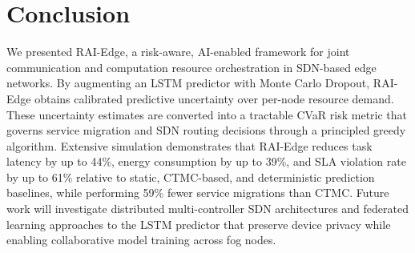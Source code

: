 \documentclass[conference]{IEEEtran}
\begin{document}
\section{Conclusion}
\label{sec:conclusion}

We presented RAI-Edge, a risk-aware, AI-enabled framework for joint
communication and computation resource orchestration in SDN-based edge
networks. By augmenting an LSTM predictor with Monte Carlo Dropout,
RAI-Edge obtains calibrated predictive uncertainty over per-node
resource demand. These uncertainty estimates are converted into a
tractable CVaR risk metric that governs service migration and SDN
routing decisions through a principled greedy algorithm. Extensive
simulation demonstrates that RAI-Edge reduces task latency by up to
44\%, energy consumption by up to 39\%, and SLA violation rate by up
to 61\% relative to static, CTMC-based, and deterministic prediction
baselines, while performing 59\% fewer service migrations than CTMC.
Future work will investigate distributed multi-controller SDN
architectures and federated learning approaches to the LSTM predictor
that preserve device privacy while enabling collaborative model
training across fog nodes.



\end{document}
